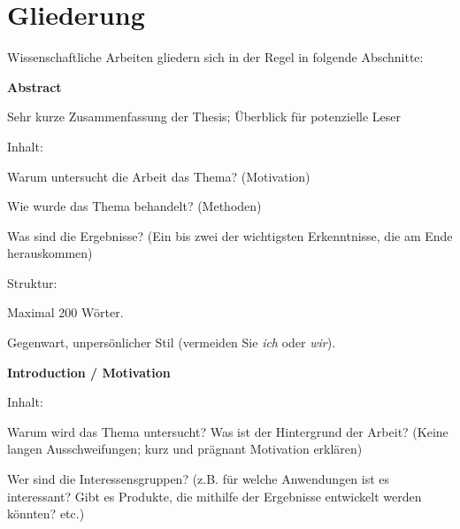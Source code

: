 \section{Gliederung}
Wissenschaftliche Arbeiten gliedern sich in der Regel in folgende Abschnitte:
\begin{enumerate}
    \item[] \textbf{Abstract} \vspace{-4 mm}
    \begin{compactitem}
        \item Sehr kurze Zusammenfassung der Thesis; Überblick für potenzielle Leser
        \item Inhalt:
        \begin{compactitem}
            \item Warum untersucht die Arbeit das Thema? (Motivation)
            \item Wie wurde das Thema behandelt? (Methoden)
            \item Was sind die Ergebnisse? (Ein bis zwei der wichtigsten Erkenntnisse, die am Ende herauskommen)
        \end{compactitem}
        \item Struktur:
        \begin{compactitem}
            \item Maximal 200 Wörter.
            \item Gegenwart, unpersönlicher Stil (vermeiden Sie \textit{ich} oder \textit{wir}).
        \end{compactitem}
    \end{compactitem}
    \item \textbf{Introduction / Motivation} \vspace{-4 mm}
    \begin{compactitem}
        \item Inhalt:
        \begin{compactitem}
            \item Warum wird das Thema untersucht? Was ist der Hintergrund der Arbeit? (Keine langen Ausschweifungen; kurz und prägnant Motivation erklären)
            \item Wer sind die Interessensgruppen? (z.B. für welche Anwendungen ist es interessant? Gibt es Produkte, die mithilfe der Ergebnisse entwickelt werden könnten? etc.)

\end{compactitem}
\end{compactitem}
\end{enumerate}
